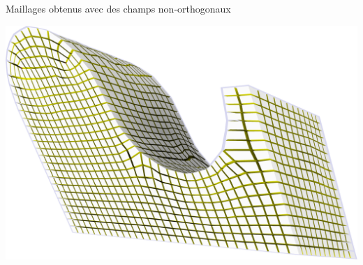 \begin{frame}{Maillages obtenus avec des champs non-orthogonaux}
\begin{minipage}[c]{0.48\textwidth}
    \includegraphics[width=.7\textwidth]{img_spm_ff/shear_1.png}
\end{minipage}
\end{frame} 

\fi